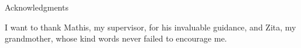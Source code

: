 \thispagestyle{empty}

\vspace*{20mm}

\begin{center}
    { Acknowledgments}
\end{center}

\vspace{10mm}

I want to thank Mathis, my supervisor, for his invaluable guidance, and Zita, my grandmother, whose kind words never failed to encourage me.

\cleardoublepage{}
